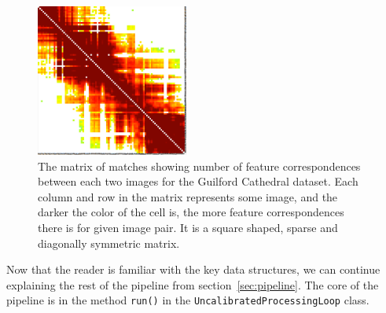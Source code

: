 \begin{figure}[ht]
	\begin{center}
		\includegraphics[keepaspectratio,width=5cm]{fig/matches-matrix.pdf}
	\end{center}
	\caption{The matrix of matches showing number of feature correspondences between each two images for the Guilford Cathedral dataset. Each column and row in the matrix represents some image, and the darker the color of the cell is, the more feature correspondences there is for given image pair. It is a square shaped, sparse and diagonally symmetric matrix. }
	\label{fig:matches-matrix}
\end{figure}


Now that the reader is familiar with the key data structures, we can continue explaining the rest of the pipeline from section~\ref{sec:pipeline}. The core of the pipeline is in the method \texttt{run()} in the \texttt{UncalibratedProcessingLoop} class.

